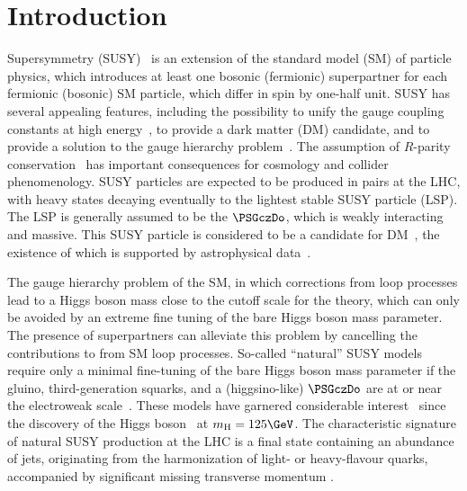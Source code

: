 \maketitle


\section{Introduction}
\label{sec:introduction}

Supersymmetry (SUSY)~\cite{ref:SUSY-1, ref:SUSY0, ref:SUSY3,
  ref:SUSY1} is an extension of the standard model (SM) of particle
physics, which introduces at least one bosonic (fermionic)
superpartner for each fermionic (bosonic) SM particle, which differ in
spin by one-half unit. SUSY has several appealing features, including
the possibility to unify the gauge coupling constants at high
energy~\cite{Dimopoulos:1981yj, Ibanez:1981yh, Marciano:1981un}, to
provide a dark matter (DM) candidate, and to provide a solution to the
gauge hierarchy problem~\cite{ref:hierarchy1, ref:hierarchy2}. The
assumption of $R$-parity conservation~\cite{Farrar:1978xj} has
important consequences for cosmology and collider phenomenology. SUSY
particles are expected to be produced in pairs at the LHC, with heavy
states decaying eventually to the lightest stable SUSY particle
(LSP). The LSP is generally assumed to be the $\PSGczDo$, which is
weakly interacting and massive. This SUSY particle is considered to be
a candidate for DM~\cite{Jungman:1995df}, the existence of which is
supported by astrophysical data~\cite{1674-1137-38-9-090001}.

The gauge hierarchy problem of the SM, in which corrections from loop
processes lead to a Higgs boson mass \higgsmass close to the cutoff
scale for the theory, which can only be avoided by an extreme fine
tuning of the bare Higgs boson mass parameter. The presence of
superpartners can alleviate this problem by cancelling the
contributions to \higgsmass from SM loop processes. So-called
``natural'' SUSY models require only a minimal fine-tuning of the bare
Higgs boson mass parameter if the gluino, third-generation squarks,
and a (higgsino-like) $\PSGczDo$ are at or near the electroweak
scale~\cite{ref:barbierinsusy}. These models have garnered
considerable interest~\cite{Delgado:2012eu, Boehm:1999tr,
  Carena:2008mj, Grober:2014aha, Grober:2015fia, Boehm:1999bj,
  Balazs:2004bu, Martin:2007gf, Martin:2007hn} since the discovery of
the Higgs boson~\cite{ref:atlashiggsdiscovery, ref:cmshiggsdiscovery,
  ref:cmshiggsdiscoverylong} at $\higgsmass = 125\GeV$. The
characteristic signature of natural SUSY production at the LHC is a
final state containing an abundance of jets, originating from the
harmonization of light- or heavy-flavour quarks, accompanied by
significant missing transverse momentum \ptvecmiss.

